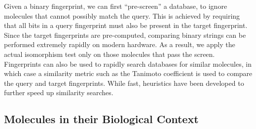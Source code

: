 \documentclass{sig-alternate}
\begin{document}
Given a binary fingerprint, we can first ``pre-screen'' a database, to
ignore molecules that cannot possibly match the query. This is
achieved by requiring that all bits in a query fingerprint must also
be present in the target fingerprint. Since the target fingerprints
are pre-computed, comparing binary strings can be performed extremely
rapidly on modern hardware. As a result, we apply the actual
isomorphism test only on those molecules that pass the
screen. Fingerprints can also be used to rapidly search databases for
similar molecules, in which case a similarity metric such as the
Tanimoto coefficient is used to compare the query and target
fingerprints. While fast, heuristics have been developed
\cite{Swamidass:2007ve} to further speed up similarity searches.

\subsection{Molecules in their Biological Context}
\label{sec:prof-ident}
\end{document}
